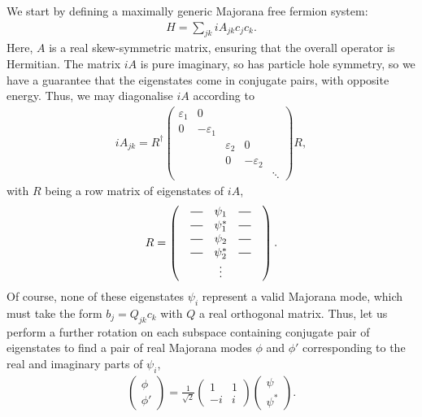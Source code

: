 We start by defining a maximally generic Majorana free fermion system:
\begin{align}
    H = \sum_{jk} iA_{jk} c_j c_k.
\end{align}
Here, $A$ is a real skew-symmetric matrix, ensuring that the overall operator is Hermitian. The matrix $iA$ is pure imaginary, so has particle hole symmetry, so we have a guarantee that the eigenstates come in conjugate pairs, with opposite energy. Thus, we may diagonalise $iA$ according to
\begin{align}
    iA_{jk} = R ^\dag 
    \begin{pmatrix}
        \varepsilon_1 & 0 &  &  & \\ 
        0& - \varepsilon_1 &  &  & \\ 
        &  &  \varepsilon_2& 0 & \\ 
        &  & 0 & -\varepsilon_2 & \\ 
        &  &  &  & \ddots 
    \end{pmatrix}
    R,
\end{align}
with $R$ being a row matrix of eigenstates of $iA$,
\begin{align}
    R = \begin{pmatrix} 
        & \horzbar & \psi_1 & \horzbar & \\
        & \horzbar & \psi_1^* & \horzbar & \\ 
        & \horzbar & \psi_2 & \horzbar & \\ 
        & \horzbar & \psi_2^* & \horzbar & \\
        &  & \vdots & & 
    \end{pmatrix} .
\end{align}
Of course, none of these eigenstates $\psi_i$ represent a valid Majorana mode, which must take the form $b_{j} = Q_{jk} c_k$ with $Q$ a real orthogonal matrix. Thus, let us perform a further rotation on each subspace containing conjugate pair of eigenstates to find a pair of real Majorana modes $\phi$ and $\phi'$ corresponding to the real and imaginary parts of $\psi_i$,
\begin{align}
    \begin{pmatrix}
        \phi \\
        \phi'
    \end{pmatrix} = \frac{1}{\sqrt 2}
    \begin{pmatrix}
        1  & 1 \\
        -i & i
    \end{pmatrix} \begin{pmatrix}
        \psi \\
        \psi^*
    \end{pmatrix}.
\end{align}
